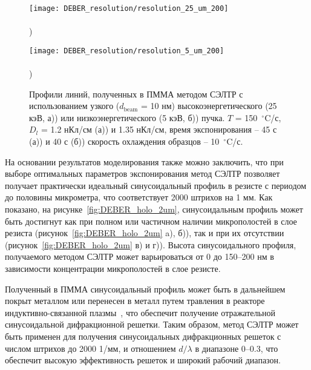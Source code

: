 \begin{figure}[t]
	\begin{minipage}{0.48\textwidth}
		\texttt{[image: DEBER\_resolution/resolution\_25\_um\_200]} \\
		\vspace{-28.7ex} \\ ) \\ \vspace{28.7ex}
	\end{minipage}
	\begin{minipage}{0.48\textwidth}
		\texttt{[image: DEBER\_resolution/resolution\_5\_um\_200]} \\
		\vspace{-28.7ex} \\ ) \\ \vspace{28.7ex}
	\end{minipage}
	\vspace{-3.5em}
	\caption{Профили линий, полученных в ПММА методом СЭЛТР с использованием узкого ($d_\mathrm{beam}$ = 10 нм) высокоэнергетического (25 кэВ, а)) или низкоэнергетического (5 кэВ, б)) пучка. $T$ = 150~$^\circ$C/с, $D_l$ = 1.2 нКл/см (а)) и 1.35 нКл/см, время экспонирования -- 45 с (а)) и 40 с (б)) скорость охлаждения образцов -- 10~$^\circ$C/с.}
	\label{fig:DEBER_resolution}
\end{figure}

На основании результатов моделирования также можно заключить, что при выборе оптимальных параметров экспонирования метод СЭЛТР позволяет получает практически идеальный синусоидальный профиль в резисте с периодом до половины микрометра, что соответствует 2000 штрихов на 1 мм. Как показано, на рисунке~\ref{fig:DEBER_holo_2um}, синусоидальным профиль может быть достигнут как при полном или частичном наличии микрополостей в слое резиста (рисунок~\ref{fig:DEBER_holo_2um} a), б)), так и при их отсутствии (рисунок~\ref{fig:DEBER_holo_2um} в) и г)). Высота синусоидального профиля, получаемого методом СЭЛТР может варьироваться от 0 до 150--200 нм в зависимости концентрации микрополостей в слое резисте.

Полученный в ПММА синусоидальный профиль может быть в дальнейшем покрыт металлом или перенесен в металл путем травления в реакторе индуктивно-связанной плазмы~\cite{Bruk_2016_mee}, что обеспечит получение отражательной синусоидальной дифракционной решетки. Таким образом, метод СЭЛТР может быть применен для получения синусоидальных дифракционных решеток с числом штрихов до 2000 1/мм, и отношением $d / \lambda$ в диапазоне 0--0.3, что обеспечит высокую эффективность решеток и широкий рабочий диапазон.

